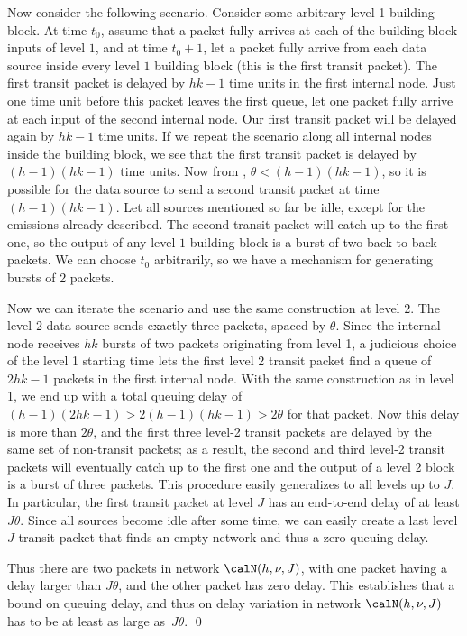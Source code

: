Now consider the following scenario. Consider some arbitrary level
1 building block. At time $t_0$, assume that a packet fully
arrives at each of the building block inputs of level $1$, and at
time $t_0+1$, let a packet fully arrive from each data source
inside every level $1$ building block (this is the first transit
packet). The first transit packet is delayed by $hk-1$ time units
in the first internal node. Just one time unit before this packet
leaves the first queue, let one packet fully arrive at each input
of the second internal node. Our first transit packet will be
delayed again by $hk-1$ time units. If we repeat the scenario
along all internal nodes inside the building block, we see that
the first transit packet is delayed by $(h-1)(hk-1)$ time units.
Now from , $\theta < (h-1)(hk-1)$, so it is possible for
the data source to send a second transit packet at time
$(h-1)(hk-1)$. Let all sources mentioned so far be idle, except
for the emissions already described. The second transit packet
will catch up to the first one, so the output of any level $1$
building block is a burst of two back-to-back packets. We can
choose $t_0$ arbitrarily, so we have a mechanism for generating
bursts of 2 packets.

Now we can iterate the scenario and use the same construction at
level $2$. The level-2 data source sends exactly three packets,
spaced by $\theta$. Since the internal node receives $hk$ bursts
of two packets originating from level 1, a judicious choice of the
level 1 starting time lets the first level 2 transit packet find a
queue of $2hk -1$ packets in the first internal node. With the
same construction as in level 1, we end up with a total queuing
delay of $(h-1)(2hk -1) > 2(h-1)(hk-1)> 2\theta$ for that packet.
Now this delay is more than $2 \theta$, and the first three
level-2 transit packets are delayed by the same set of non-transit
packets; as a result, the second and third level-2 transit packets
will eventually catch up to the first one and the output of a
level 2 block is a burst of three packets. This procedure easily
generalizes to all levels up to $J$. In particular, the first
transit packet at level $J$ has an end-to-end delay of at least
$J\theta$. Since all sources become idle after some time, we can
easily create a last level $J$ transit packet that finds an empty
network and thus a zero queuing delay.

Thus there are two packets in network $\calN(h, \nu, J)$, with one
packet having a delay larger than $J \theta$, and the other packet
has zero delay. This establishes that a bound on queuing delay,
and thus on delay variation in network $\calN(h, \nu, J)$ has to
be at least as large as~$J \theta$. \qed

